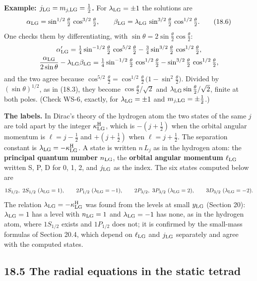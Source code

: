 \documentclass[
  10pt,
]{article}
\begin{document}
\textbf{Example: \(j_{\rm LG}=m_{j,{\rm LG}}=\tfrac12\).} For
\(\lambda_{\rm LG}=\pm1\) the solutions are
\[\alpha_{\rm LG}=\sin^{1/2}\tfrac\theta2\,\cos^{3/2}\tfrac\theta2,\qquad\beta_{\rm LG}=\lambda_{\rm LG}\,\sin^{3/2}\tfrac\theta2\,\cos^{1/2}\tfrac\theta2.\tag{18.6}\]
One checks them by differentiating, with
\(\sin\theta=2\sin\tfrac\theta2\cos\tfrac\theta2\):
\[\begin{gathered}\alpha_{\rm LG}'=\tfrac14\sin^{-1/2}\tfrac\theta2\,\cos^{5/2}\tfrac\theta2-\tfrac34\sin^{3/2}\tfrac\theta2\,\cos^{1/2}\tfrac\theta2,\\
\frac{\alpha_{\rm LG}}{2\sin\theta}-\lambda_{\rm LG}\beta_{\rm LG}=\tfrac14\sin^{-1/2}\tfrac\theta2\,\cos^{1/2}\tfrac\theta2-\sin^{3/2}\tfrac\theta2\,\cos^{1/2}\tfrac\theta2,\end{gathered}\]
and the two agree because
\(\cos^{5/2}\tfrac\theta2=\cos^{1/2}\tfrac\theta2\,\big(1-\sin^2\tfrac\theta2\big)\).
Divided by \((\sin\theta)^{1/2}\), as in (18.3), they become
\(\cos\tfrac\theta2/\sqrt2\) and
\(\lambda_{\rm LG}\sin\tfrac\theta2/\sqrt2\), finite at both poles.
(Check WS-6, exactly, for \(\lambda_{\rm LG}=\pm1\) and
\(m_{j,{\rm LG}}=\pm\tfrac12\).)

\textbf{The labels.} In Dirac's theory of the hydrogen atom the two
states of the same \(j\) are told apart by the integer
\(\kappa^{\rm H}_{\rm LG}\), which is \(-(j+\tfrac12)\) when the orbital
angular momentum is \(\ell=j-\tfrac12\) and \(+(j+\tfrac12)\) when
\(\ell=j+\tfrac12\). The separation constant is
\(\lambda_{\rm LG}=-\kappa^{\rm H}_{\rm LG}\). A state is written
\(n\,L_j\) as in the hydrogen atom: the \textbf{principal quantum
number} \(n_{\rm LG}\), the \textbf{orbital angular momentum}
\(\ell_{\rm LG}\) written S, P, D for 0, 1, 2, and \(j_{\rm LG}\) as the
index. The six states computed below are
\[1S_{1/2},\ 2S_{1/2}\ (\lambda_{\rm LG}=1),\qquad2P_{1/2}\ (\lambda_{\rm LG}=-1),\qquad2P_{3/2},\ 3P_{3/2}\ (\lambda_{\rm LG}=2),\qquad3D_{3/2}\ (\lambda_{\rm LG}=-2).\]
The relation \(\lambda_{\rm LG}=-\kappa^{\rm H}_{\rm LG}\) was found
from the levels at small \(y_{\rm LG}\) (Section 20):
\(\lambda_{\rm LG}=1\) has a level with \(n_{\rm LG}=1\) and
\(\lambda_{\rm LG}=-1\) has none, as in the hydrogen atom, where
\(1S_{1/2}\) exists and \(1P_{1/2}\) does not; it is confirmed by the
small-mass formulas of Section 20.4, which depend on \(\ell_{\rm LG}\)
and \(j_{\rm LG}\) separately and agree with the computed states.

\hypertarget{the-radial-equations-in-the-static-tetrad}{%
\subsection{18.5 The radial equations in the static
tetrad}\label{the-radial-equations-in-the-static-tetrad}}
\end{document}
